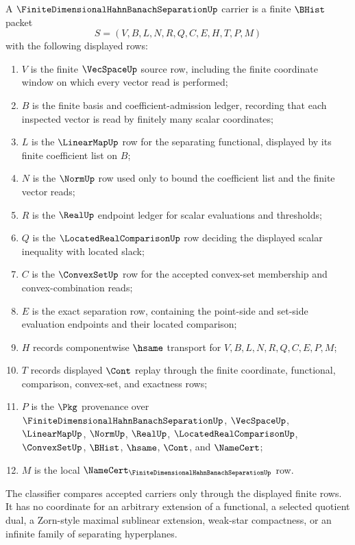 \begin{definition}
\label{def:finite-dimensional-hahn-banach-separation-carrier}
A $\FiniteDimensionalHahnBanachSeparationUp$ carrier is a finite $\BHist$ packet
$$
S=(V,B,L,N,R,Q,C,E,H,T,P,M)
$$
with the following displayed rows:
\begin{enumerate}
\item $V$ is the finite $\VecSpaceUp$ source row, including the finite coordinate window on which every vector read is performed;
\item $B$ is the finite basis and coefficient-admission ledger, recording that each inspected vector is read by finitely many scalar coordinates;
\item $L$ is the $\LinearMapUp$ row for the separating functional, displayed by its finite coefficient list on $B$;
\item $N$ is the $\NormUp$ row used only to bound the coefficient list and the finite vector reads;
\item $R$ is the $\RealUp$ endpoint ledger for scalar evaluations and thresholds;
\item $Q$ is the $\LocatedRealComparisonUp$ row deciding the displayed scalar inequality with located slack;
\item $C$ is the $\ConvexSetUp$ row for the accepted convex-set membership and convex-combination reads;
\item $E$ is the exact separation row, containing the point-side and set-side evaluation endpoints and their located comparison;
\item $H$ records componentwise $\hsame$ transport for $V,B,L,N,R,Q,C,E,P,M$;
\item $T$ records displayed $\Cont$ replay through the finite coordinate, functional, comparison, convex-set, and exactness rows;
\item $P$ is the $\Pkg$ provenance over $\FiniteDimensionalHahnBanachSeparationUp$, $\VecSpaceUp$, $\LinearMapUp$, $\NormUp$, $\RealUp$, $\LocatedRealComparisonUp$, $\ConvexSetUp$, $\BHist$, $\hsame$, $\Cont$, and $\NameCert$;
\item $M$ is the local $\NameCert_{\FiniteDimensionalHahnBanachSeparationUp}$ row.
\end{enumerate}
The classifier compares accepted carriers only through the displayed finite rows. It has no coordinate for an arbitrary extension of a functional, a selected quotient dual, a Zorn-style maximal sublinear extension, weak-star compactness, or an infinite family of separating hyperplanes.
\end{definition}

